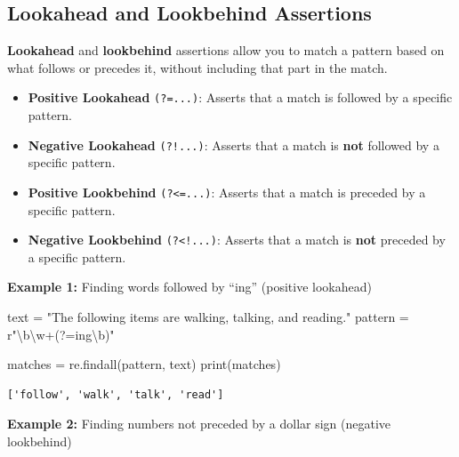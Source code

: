 \documentclass[
  letterpaper,
  DIV=11,
  numbers=noendperiod]{scrreprt}
\newenvironment{Shaded}{\begin{snugshade}}{\end{snugshade}}
\newcommand{\BuiltInTok}[1]{\textcolor[rgb]{0.00,0.23,0.31}{#1}}
\newcommand{\CommentTok}[1]{\textcolor[rgb]{0.37,0.37,0.37}{#1}}
\newcommand{\NormalTok}[1]{\textcolor[rgb]{0.00,0.23,0.31}{#1}}
\newcommand{\OperatorTok}[1]{\textcolor[rgb]{0.37,0.37,0.37}{#1}}
\newcommand{\StringTok}[1]{\textcolor[rgb]{0.13,0.47,0.30}{#1}}
\newcommand{\VerbatimStringTok}[1]{\textcolor[rgb]{0.13,0.47,0.30}{#1}}
\providecommand{\tightlist}{%
  \setlength{\itemsep}{0pt}\setlength{\parskip}{0pt}}\usepackage{longtable,booktabs,array}
\begin{document}
\hypertarget{lookahead-and-lookbehind-assertions}{%
\subsection{Lookahead and Lookbehind
Assertions}\label{lookahead-and-lookbehind-assertions}}

\textbf{Lookahead} and \textbf{lookbehind} assertions allow you to match
a pattern based on what follows or precedes it, without including that
part in the match.

\begin{itemize}
\tightlist
\item
  \textbf{Positive Lookahead} \texttt{(?=...)}: Asserts that a match is
  followed by a specific pattern.
\item
  \textbf{Negative Lookahead} \texttt{(?!...)}: Asserts that a match is
  \textbf{not} followed by a specific pattern.
\item
  \textbf{Positive Lookbehind} \texttt{(?\textless{}=...)}: Asserts that
  a match is preceded by a specific pattern.
\item
  \textbf{Negative Lookbehind} \texttt{(?\textless{}!...)}: Asserts that
  a match is \textbf{not} preceded by a specific pattern.
\end{itemize}

\textbf{Example 1:} Finding words followed by ``ing'' (positive
lookahead)

\begin{Shaded}
\begin{Highlighting}[]
\NormalTok{text }\OperatorTok{=} \StringTok{"The following items are walking, talking, and reading."}
\NormalTok{pattern }\OperatorTok{=} \VerbatimStringTok{r"\textbackslash{}b\textbackslash{}w+(?=ing\textbackslash{}b)"}

\NormalTok{matches }\OperatorTok{=}\NormalTok{ re.findall(pattern, text)}
\BuiltInTok{print}\NormalTok{(matches)  }
\end{Highlighting}
\end{Shaded}

\begin{verbatim}
['follow', 'walk', 'talk', 'read']
\end{verbatim}

\textbf{Example 2:} Finding numbers not preceded by a dollar sign
(negative lookbehind)

\begin{Shaded}
\end{Shaded}
\end{document}
